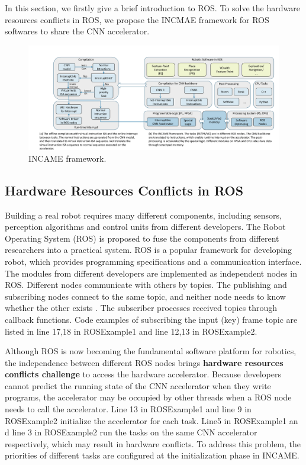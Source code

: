 \label{sec:incame}

In this section, we firstly give a brief introduction to ROS\cite{quigley2009ros}. To solve the hardware resources conflicts in ROS, we propose the INCMAE framework for ROS softwares to share the CNN accelerator.

\begin{figure}[t]
	\centering
    \includegraphics[width=0.99\linewidth]{fig/incame.pdf}
    \caption{ INCAME framework.}
	\label{fig:incame}
\end{figure}


\subsection{Hardware Resources Conflicts in ROS}

Building a real robot requires many different components, including sensors, perception algorithms and control units from different developers. The Robot Operating System (ROS) \cite{quigley2009ros} is proposed to fuse the components from different researchers into a practical system. ROS is a popular framework for developing robot, which provides programming specifications and a communication interface. The modules from different developers are implemented as independent nodes in ROS. Different nodes communicate with others by topics. The publishing and subscribing nodes connect to the same topic, and neither node needs to know whether the other exists \cite{quigley2009ros}. The subscriber processes received topics through callback functions. 
Code examples of subscribing the input (key) frame topic are listed in line 17,18 in ROSExample1 and line 12,13 in ROSExample2.

Although ROS is now becoming the fundamental software platform for robotics, the independence between different ROS nodes brings \textbf{hardware resources conflicts challenge} to access the hardware accelerator. 
Because developers cannot predict the running state of the CNN accelerator when they write programs, the accelerator may be occupied by other threads when a ROS node needs to call the accelerator.
Line 13 in ROSExample1 and line 9 in ROSExample2 initialize the accelerator for each task. Line5 in ROSExample1 an d line 3 in ROSExample2 run the tasks on the same CNN accelerator respectively, which may result in hardware conflicts. 
To address this problem, the priorities of different tasks are configured at the initialization phase in INCAME.

